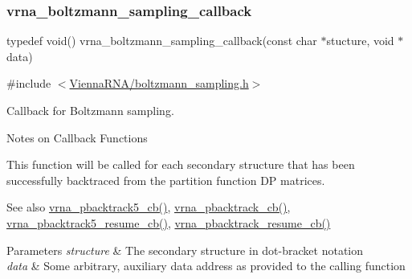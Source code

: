 \subsubsection{\texorpdfstring{vrna\_boltzmann\_sampling\_callback}{vrna\_boltzmann\_sampling\_callback}}
{\footnotesize\ttfamily typedef void() vrna\+\_\+boltzmann\+\_\+sampling\+\_\+callback(const char $\ast$stucture, void $\ast$data)}



{\ttfamily \#include $<$\mbox{\hyperlink{boltzmann__sampling_8h}{Vienna\+R\+N\+A/boltzmann\+\_\+sampling.\+h}}$>$}



Callback for Boltzmann sampling. 

\begin{DoxyRefDesc}{Notes on Callback Functions}
\item[\mbox{\hyperlink{callbacks__callbacks000001}{Notes on Callback Functions}}]This function will be called for each secondary structure that has been successfully backtraced from the partition function DP matrices. \end{DoxyRefDesc}


\begin{DoxySeeAlso}{See also}
\mbox{\hyperlink{group__subopt__stochbt_ga626beb5b5b962d7e7c8433cd2cfd4e93}{vrna\+\_\+pbacktrack5\+\_\+cb()}}, \mbox{\hyperlink{group__subopt__stochbt_ga843fa953a15337b15cc68401adad84d7}{vrna\+\_\+pbacktrack\+\_\+cb()}}, \mbox{\hyperlink{group__subopt__stochbt_ga4a91dc092580faf7799476e8dd76e0ac}{vrna\+\_\+pbacktrack5\+\_\+resume\+\_\+cb()}}, \mbox{\hyperlink{group__subopt__stochbt_ga6fc5ce952995e53baef52cad5581c063}{vrna\+\_\+pbacktrack\+\_\+resume\+\_\+cb()}}
\end{DoxySeeAlso}

\begin{DoxyParams}{Parameters}
{\em structure} & The secondary structure in dot-\/bracket notation \\
\hline
{\em data} & Some arbitrary, auxiliary data address as provided to the calling function \\
\hline
\end{DoxyParams}
\mbox{\label{group__subopt__stochbt_gaa59c30efbed96bf9aaf8005584c72e63}} 
